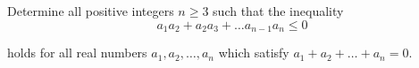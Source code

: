 Determine all positive integers $n\ge 3$ such that the inequality\[a_1a_2+a_2a_3+\ldots a_{n-1}a_n\le 0\]

holds for all real numbers $a_1,a_2,\ldots , a_n$ which satisfy $a_1+a_2+\ldots +a_n=0$.